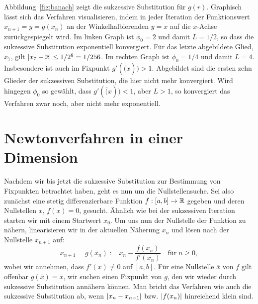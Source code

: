 Abbildung~\ref{fig:banach} zeigt die sukzessive Substitution für
$g(r)$. Graphisch lässt sich das Verfahren visualisieren, indem in
jeder Iteration der Funktionswert $x_{n+1} = y =g(x_{n})$ an der
Winkelhalbierenden $y=x$ auf die $x$-Achse zurückgespiegelt wird. Im
linken Graph ist $\phi_0=2$ und damit $L=1/2$, so dass die sukzessive
Substitution exponentiell konvergiert. Für das letzte abgebildete
Glied, $x_7$, gilt $\left\lvert{x_7-\overline{x}}\right\rvert \le 1/2^8 = 1/256$. Im
rechten Graph ist $\phi_0=1/4$ und damit $L=4$. Insbesondere ist auch
im Fixpunkt $g'(\overline(x))>1$. Abgebildet sind die ersten zehn
Glieder der sukzessiven Substitution, die hier nicht mehr
konvergiert. Wird hingegen $\phi_0$ so gewählt, dass 
$g'(\overline(x))<1$, aber $L>1$, so konvergiert das Verfahren zwar
noch, aber nicht mehr exponentiell.

\section{Newtonverfahren in einer Dimension}

Nachdem wir bis jetzt die sukzessive Substitution zur Bestimmung von
Fixpunkten betrachtet haben, geht es nun um die Nullstellensuche. Sei
also zunächst eine stetig differenzierbare Funktion $f:[a,b]\to\mathbb{R}$
gegeben und deren Nullstellen $x$, $f(x) = 0$, gesucht. Ähnlich wie
bei der sukzessiven Iteration starten wir mit einem Startwert
$x_0$. Um uns nun der Nullstelle der Funktion zu nähern, linearisieren
wir in der aktuellen Näherung $x_n$ und lösen nach der Nullstelle
$x_{n+1}$ auf:
\begin{equation}
  x_{n+1} = g(x_n) := x_n - \frac{f(x_n)}{f'(x_n)}\quad\text{für}\; n\ge 0,
\end{equation}
wobei wir annehmen, dass $f'(x)\neq 0$ auf $[a,b]$.  Für eine
Nullstelle $\overline{x}$ von $f$ gilt offenbar $g(\overline{x}) =
\overline{x}$, \dh wir suchen einen Fixpunkt von $g$, den wir wieder
durch sukzessive Substitution annähern können. Man bricht das
Verfahren wie auch die sukzessive Substitution ab, wenn
$\left\lvert{x_{n}-x_{n-1}}\right\rvert$ bzw. $\left\lvert{f(x_n)}\right\rvert$ hinreichend klein sind.

